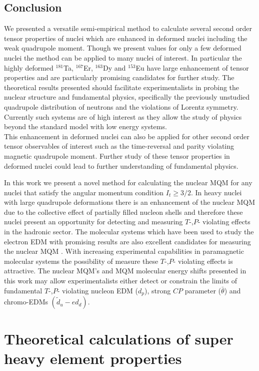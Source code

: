 \documentclass[10pt,a4paper, twoside, openright]{report}
\begin{document}
\chapter{Conclusion} \label{chap:P1Conc}

We presented a versatile semi-empirical method to calculate several second order tensor properties of nuclei which are enhanced in deformed nuclei including the weak quadrupole moment. Though we present values for only a few deformed nuclei the method can be applied to many nuclei of interest. In particular the highly deformed $^{181}$Ta, $^{167}$Er, $^{163}$Dy and $^{153}$Eu have large enhancement of tensor properties and are particularly promising candidates for further study. The theoretical results presented should facilitate experimentalists in probing the nuclear structure and fundamental physics, specifically the previously unstudied quadrupole distribution of neutrons and the violations of Lorentz symmetry. Currently such systems are of high interest  as they allow the study of physics beyond the standard model with low energy systems. \\

This enhancement in deformed nuclei can also be applied for other second order tensor observables of interest such as the time-reversal and parity violating magnetic quadrupole moment. Further study of these tensor properties in deformed nuclei  could lead to further understanding of fundamental physics.

In this work we present a novel method for calculating the nuclear MQM for any nuclei that satisfy the angular momentum condition $I_t \geq 3/2$. In heavy nuclei with large quadrupole deformations there is an enhancement of the nuclear MQM  due to the collective effect of partially filled nucleon shells and therefore these nuclei present an opportunity for detecting and measuring $T$-,$P$- violating effects in the hadronic sector. The molecular systems which have been used to study the electron EDM with promising results are also excellent candidates for measuring the nuclear MQM  \cite{Skripnikov2017, Skripnikov2014ThO}. With increasing experimental capabilities  in paramagnetic molecular systems the possibility of measure these $T$-,$P$- violating effects is attractive. The nuclear MQM's and MQM molecular energy shifts presented in this work may allow experimentalists either detect or constrain the limits of fundamental $T$-,$P$- violating nucleon EDM ($d_p$), strong $CP$ parameter ($\bar{\theta}$) and chromo-EDMs $(\tilde{d}_{u} - e{d}_d) $. 
\part{Theoretical calculations of super heavy element properties}
\end{document}
